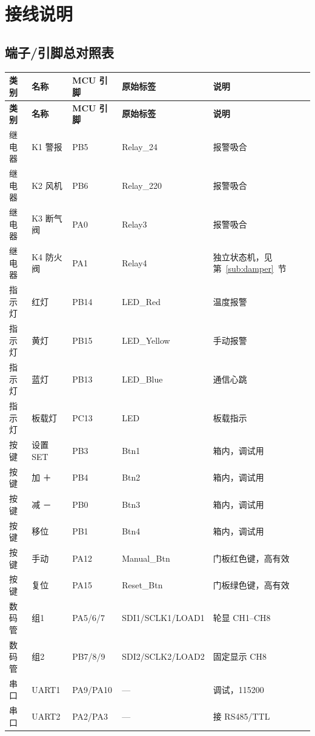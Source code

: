 \documentclass[a4paper,11pt]{ctexart}
\begin{document}
\section{接线说明}
\subsection{端子/引脚总对照表}
\renewcommand{\arraystretch}{1.25}
\begin{longtable}{|L{1.35cm}|L{2.4cm}|C{1.75cm}|L{3.3cm}|L{4.2cm}|}
\hline
\textbf{类别} & \textbf{名称} & \textbf{MCU 引脚} & \textbf{原始标签} & \textbf{说明}\\
\hline
\endfirsthead
\hline
\textbf{类别} & \textbf{名称} & \textbf{MCU 引脚} & \textbf{原始标签} & \textbf{说明}\\
\hline
\endhead
继电器 & K1 警报    & PB5 & Relay\_24  & 报警吸合\\ \hline
继电器 & K2 风机    & PB6 & Relay\_220 & 报警吸合\\ \hline
继电器 & K3 断气阀  & PA0 & Relay3     & 报警吸合\\ \hline
继电器 & K4 防火阀  & PA1 & Relay4     & 独立状态机，见第~\ref{sub:damper}~节\\ \hline
指示灯 & 红灯       & PB14 & LED\_Red    & 温度报警\\ \hline
指示灯 & 黄灯       & PB15 & LED\_Yellow & 手动报警\\ \hline
指示灯 & 蓝灯       & PB13 & LED\_Blue   & 通信心跳\\ \hline
指示灯 & 板载灯     & PC13 & LED         & 板载指示\\ \hline
按键 & 设置 SET & PB3 & Btn1 & 箱内，调试用\\ \hline
按键 & 加 ＋    & PB4 & Btn2 & 箱内，调试用\\ \hline
按键 & 减 －    & PB0 & Btn3 & 箱内，调试用\\ \hline
按键 & 移位     & PB1 & Btn4 & 箱内，调试用\\ \hline
按键 & 手动     & PA12 & Manual\_Btn & 门板红色键，高有效\\ \hline
按键 & 复位     & PA15 & Reset\_Btn  & 门板绿色键，高有效\\ \hline
数码管 & 组1 & PA5/6/7 & SDI1\slash SCLK1\slash LOAD1 & 轮显 CH1--CH8\\ \hline
数码管 & 组2 & PB7/8/9 & SDI2\slash SCLK2\slash LOAD2 & 固定显示 CH8\\ \hline
串口 & UART1 & PA9/PA10 & --- & 调试，115200\\ \hline
串口 & UART2 & PA2/PA3 & --- & 接 RS485/TTL\\ \hline
\end{longtable}
\renewcommand{\arraystretch}{1.0}
\end{document}
